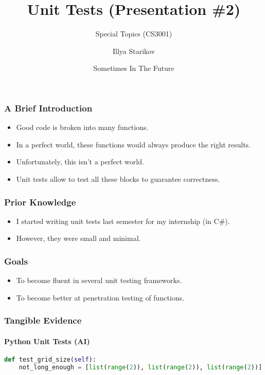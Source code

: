 \documentclass[xclolor=dvipsnames]{beamer}            %
\title{Unit Tests (Presentation \#2)}
\subtitle{Special Topics (CS3001)}
\author{Illya Starikov}
\date{Sometimes In The Future}
\institute{Missouri University of Science and Technology}
\begin{document}
\begin{darkframes}
    \maketitle

    \begin{frame}
        \frametitle{A Brief Introduction}

        \begin{itemize}
            \item Good code is broken into many functions.
            \item In a perfect world, these functions would always produce the right results.
            \item Unfortunately, this isn't a perfect world.
            \item Unit tests allow to test all these blocks to guarantee correctness.
        \end{itemize}
    \end{frame}

    \begin{frame}
        \frametitle{Prior Knowledge}

        \begin{itemize}
            \item I started writing unit tests last semester for my internship (in C\#).
            \item However, they were small and minimal.
        \end{itemize}
    \end{frame}

    \begin{frame}
        \frametitle{Goals}

        \begin{itemize}
            \item To become fluent in several unit testing frameworks.
            \item To become better at penetration testing of functions.
        \end{itemize}
    \end{frame}

    \begin{frame}[fragile]
        \frametitle{Tangible Evidence}
        \framesubtitle{Python Unit Tests (AI)}

        \footnotesize
        \begin{lstlisting}[language=Python]
def test_grid_size(self):
    not_long_enough = [list(range(2)), list(range(2)), list(range(2))]


\end{lstlisting}
\end{frame}
\end{darkframes}
\end{document}
